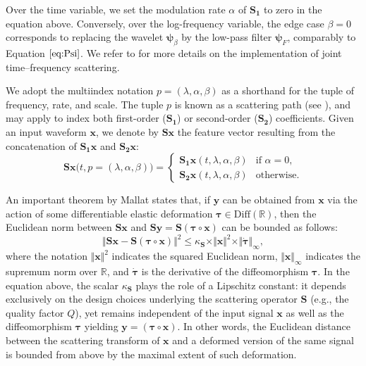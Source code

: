 \documentclass{bmcart}
\makeatletter
\newcommand*{\eg}{e.g.,\@\xspace}
\makeatother
\begin{document}
Over the time variable, we set the modulation rate $\alpha$ of $\mathbf{S_1}$ to zero in the equation above.
Conversely, over the log-frequency variable, the edge case $\beta=0$ corresponds to replacing the wavelet $\boldsymbol{\psi}_{\beta}$ by the low-pass filter $\boldsymbol{\psi}_F$, comparably to Equation $\ref{eq:Psi}$.
We refer to \cite{anden2019tsp} for more details on the implementation of joint time--frequency scattering.

We adopt the multiindex notation $p = (\lambda, \alpha, \beta)$ as a shorthand for the tuple of frequency, rate, and scale.
The tuple $p$ is known as a scattering path (see \cite{mallat2012cpam}), and may apply to index both first-order ($\mathbf{S_1}$) or second-order ($\mathbf{S_2}$) coefficients.
Given an input waveform $\boldsymbol{x}$, we denote by $\mathbf{S}\boldsymbol{x}$ the feature vector resulting from the concatenation of $\mathbf{S_1}\boldsymbol{x}$ and $\mathbf{S_2}\boldsymbol{x}$:
\begin{equation}
\mathbf{S}\boldsymbol{x}\big(t, p=(\lambda, \alpha, \beta)\big)
=\left\{
\begin{array}{ll}
\mathbf{S_{1}}\boldsymbol{x}(t,\lambda,\alpha,\beta) & \textrm{if }\alpha=0,\\
\mathbf{S_{2}}\boldsymbol{x}(t,\lambda,\alpha,\beta) & \textrm{otherwise.}
\end{array}\right.
\end{equation}

An important theorem by Mallat \cite{mallat2012cpam} states that, if $\boldsymbol{y}$ can be obtained from $\boldsymbol{x}$ via the action of some differentiable elastic deformation $\boldsymbol{\tau} \in \mathrm{Diff}(\mathbb{R})$, then the Euclidean norm between $\mathbf{S}\boldsymbol{x}$ and $\mathbf{S}\boldsymbol{y} = \mathbf{S}(\boldsymbol{\tau}\circ\boldsymbol{x})$ can be bounded as follows:
\begin{equation}
\big\Vert \mathbf{S}\boldsymbol{x} - \mathbf{S}(\boldsymbol{\tau}\circ\boldsymbol{x}) \big\Vert^2
\leq
\kappa_{\mathbf{S}} \times
\Vert \boldsymbol{x} \Vert^2 \times
\Vert \boldsymbol{\dot{\tau}} \Vert_{\infty},
\label{eq:lipschitz}
\end{equation}
where the notation $\Vert \boldsymbol{x} \Vert^2$ indicates the squared Euclidean norm, $\Vert \boldsymbol{x} \Vert_{\infty}$ indicates the supremum norm over $\mathbb{R}$, and $\boldsymbol{\dot{\tau}}$ is the derivative of the diffeomorphism $\boldsymbol{\tau}$.
In the equation above, the scalar $\kappa_{\mathbf{S}}$ plays the role of a Lipschitz constant: it depends exclusively on the design choices underlying the scattering operator $\mathbf{S}$ (\eg{} the quality factor $Q$), yet remains independent of the input signal $\boldsymbol{x}$ as well as the diffeomorphism $\boldsymbol{\tau}$ yielding $\boldsymbol{y} = (\boldsymbol{\tau}\circ\boldsymbol{x})$.
In other words, the Euclidean distance between the scattering transform of $\boldsymbol{x}$ and a deformed version of the same signal is bounded from above by the maximal extent of such deformation.
\end{document}
